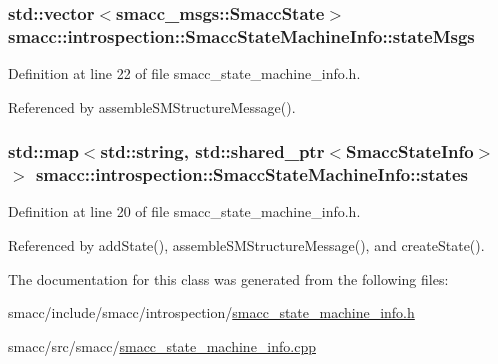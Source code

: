 \subsubsection[{\texorpdfstring{state\+Msgs}{stateMsgs}}]{\setlength{\rightskip}{0pt plus 5cm}std\+::vector$<$smacc\+\_\+msgs\+::\+Smacc\+State$>$ smacc\+::introspection\+::\+Smacc\+State\+Machine\+Info\+::state\+Msgs}\hypertarget{classsmacc_1_1introspection_1_1SmaccStateMachineInfo_a48e3ff7bbe2673d23e6942234446ebee}{}\label{classsmacc_1_1introspection_1_1SmaccStateMachineInfo_a48e3ff7bbe2673d23e6942234446ebee}


Definition at line 22 of file smacc\+\_\+state\+\_\+machine\+\_\+info.\+h.



Referenced by assemble\+S\+M\+Structure\+Message().

\subsubsection[{\texorpdfstring{states}{states}}]{\setlength{\rightskip}{0pt plus 5cm}std\+::map$<$std\+::string, std\+::shared\+\_\+ptr$<${\bf Smacc\+State\+Info}$>$ $>$ smacc\+::introspection\+::\+Smacc\+State\+Machine\+Info\+::states}\hypertarget{classsmacc_1_1introspection_1_1SmaccStateMachineInfo_aef31d74ad3669f0b0f57fe0e008cd2f8}{}\label{classsmacc_1_1introspection_1_1SmaccStateMachineInfo_aef31d74ad3669f0b0f57fe0e008cd2f8}


Definition at line 20 of file smacc\+\_\+state\+\_\+machine\+\_\+info.\+h.



Referenced by add\+State(), assemble\+S\+M\+Structure\+Message(), and create\+State().



The documentation for this class was generated from the following files\+:\begin{DoxyCompactItemize}
\item 
smacc/include/smacc/introspection/\hyperlink{smacc__state__machine__info_8h}{smacc\+\_\+state\+\_\+machine\+\_\+info.\+h}\item 
smacc/src/smacc/\hyperlink{smacc__state__machine__info_8cpp}{smacc\+\_\+state\+\_\+machine\+\_\+info.\+cpp}\end{DoxyCompactItemize}

